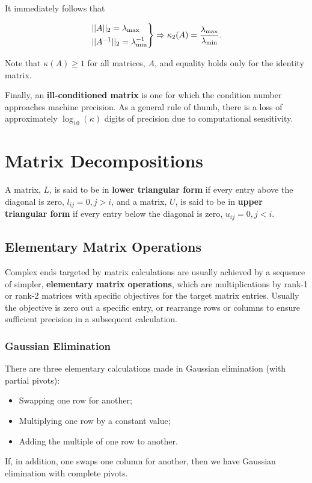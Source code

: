 \documentclass[12pt, twoside, draft]{article}
\begin{document}
It immediately follows that

\begin{equation}\label{eq:condition_number_2norm}
\begin{rcases}
||A||_2 = \lambda_{\max} \\
||A^{-1}||_2 = \lambda_{\min}^{-1}
\end{rcases}
\Rightarrow \kappa_2(A) = \frac{\lambda_{\max}}{\lambda_{\min}} .
\end{equation}

Note that $\kappa(A) \geq 1$ for all matrices, $A$, and equality holds only for the identity matrix.

Finally, an \textbf{ill-conditioned matrix} is one for which the condition number approaches machine precision.  As a general rule of thumb, there is a loss of approximately $\log_{10}(\kappa)$ digits of precision due to computational sensitivity.

\section{Matrix Decompositions}\label{sec:matix-decomposition}
A matrix, $L$, is said to be in \textbf{lower triangular form} if every entry above the diagonal is zero, $l_{ij} = 0, j > i$, and a matrix, $U$, is said to be in \textbf{upper triangular form} if every entry below the diagonal is zero, $u_{ij}= 0, j < i$.

\subsection{Elementary Matrix Operations}\label{sec:elementary-matrix-operations}
Complex ends targeted by matrix calculations are usually achieved by a sequence of simpler, \textbf{elementary matrix operations}, which are multiplications by rank-1 or rank-2 matrices with specific objectives for the target matrix entries.  Usually the objective is zero out a specific entry, or rearrange rows or columns to ensure sufficient precision in a subsequent calculation.

\subsubsection{Gaussian Elimination}\label{sec:gaussian-elimination}
There are three elementary calculations made in Gaussian elimination (with partial pivots):
\begin{itemize}[noitemsep]
\item Swapping one row for another;
\item Multiplying one row by a constant value;
\item Adding the multiple of one row to another.
\end{itemize}
If, in addition, one swaps one column for another, then we have Gaussian elimination with complete pivots. 
\end{document}
